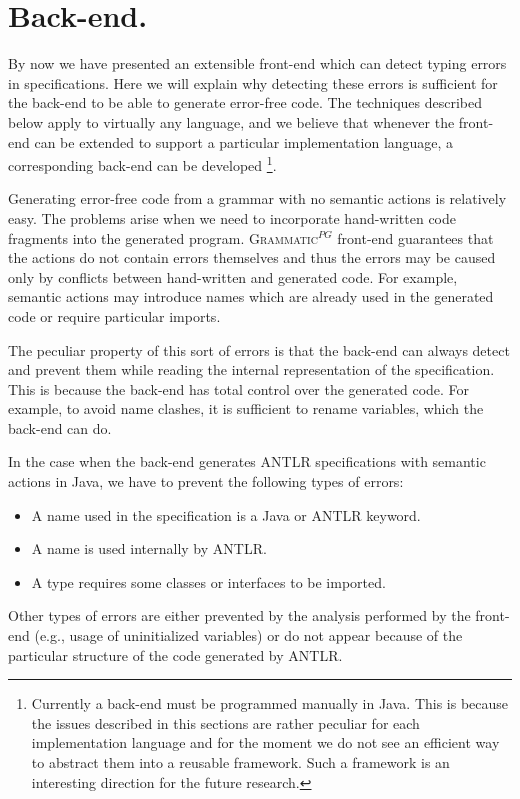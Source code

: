 \documentclass{informat} %
\newcommand{\tool}[1]{\textsc{#1}}
\newcommand{\ATF}{\textsc{Grammatic}$^{PG}$}
\begin{document}
\section{Back-end.}\label{Backend}

By now we have presented an extensible front-end which can detect typing errors in specifications. Here we will explain why detecting these errors is sufficient for the back-end to be able to generate error-free code. The techniques described below apply to virtually any language, and we believe that whenever the front-end can be extended to support a particular implementation language, a corresponding back-end can be developed \footnote{Currently a back-end must be programmed manually in Java. This is because the issues described in this sections are rather peculiar for each implementation language and for the moment we do not see an efficient way to abstract them into a reusable framework. Such a framework is an interesting direction for the future research.}.

Generating error-free code from a grammar with no semantic actions is relatively easy. The problems arise when we need to incorporate hand-written code fragments into the generated program. \ATF{} front-end guarantees that the actions do not contain errors themselves and thus the errors may be caused only by conflicts between hand-written and generated code. For example, semantic actions may introduce names which are already used in the generated code or require particular imports. 

The peculiar property of this sort of errors is that the back-end can always detect and prevent them while reading the internal representation of the specification. This is because the back-end has total control over the generated code. For example, to avoid name clashes, it is sufficient to rename variables, which the back-end can do.

In the case when the back-end generates \tool{ANTLR} specifications with semantic actions in Java, we have to prevent the following types of errors:
\begin{itemize}
	\item A name used in the specification is a Java or ANTLR keyword.
	\item A name is used internally by ANTLR.
	\item A type requires some classes or interfaces to be imported.
\end{itemize}
Other types of errors are either prevented by the analysis performed by the front-end (e.g., usage of uninitialized variables) or do not appear because of the particular structure of the code generated by \tool{ANTLR}.
\end{document}
